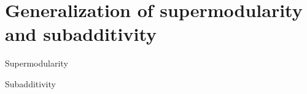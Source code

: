 \section{Generalization of supermodularity and subadditivity}

\begin{frame}{Supermodularity}
    
\end{frame}

\begin{frame}{Subadditivity}
    
\end{frame}